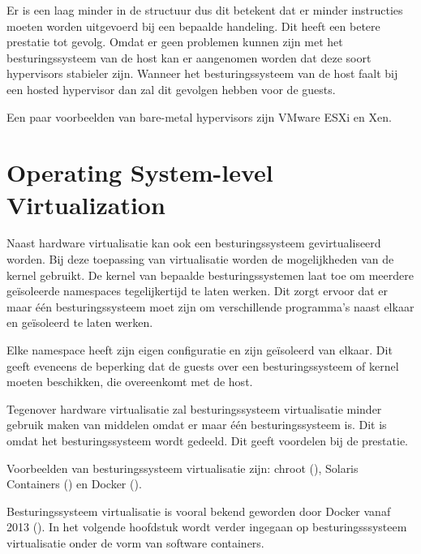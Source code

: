 Er is een laag minder in de structuur dus dit betekent dat er minder instructies moeten worden uitgevoerd bij een bepaalde handeling. Dit heeft een betere prestatie tot gevolg. Omdat er geen problemen kunnen zijn met het besturingssysteem van de host kan er aangenomen worden dat deze soort hypervisors stabieler zijn. Wanneer het besturingssysteem van de host faalt bij een hosted hypervisor dan zal dit gevolgen hebben voor de guests.

Een paar voorbeelden van bare-metal hypervisors zijn VMware ESXi en Xen.

\section{Operating System-level Virtualization}

Naast hardware virtualisatie kan ook een besturingssysteem gevirtualiseerd worden. Bij deze toepassing van virtualisatie worden de mogelijkheden van de kernel gebruikt. De kernel van bepaalde besturingssystemen laat toe om meerdere geïsoleerde namespaces tegelijkertijd te laten werken. Dit zorgt ervoor dat er maar één besturingssysteem moet zijn om verschillende programma's naast elkaar en geïsoleerd te laten werken.

Elke namespace heeft zijn eigen configuratie en zijn geïsoleerd van elkaar. Dit geeft eveneens de beperking dat de guests over een besturingssysteem of kernel moeten beschikken, die overeenkomt met de host.

Tegenover hardware virtualisatie zal besturingssysteem virtualisatie minder gebruik maken van middelen omdat er maar één besturingssysteem is. Dit is omdat het besturingssysteem wordt gedeeld. Dit geeft voordelen bij de prestatie.

Voorbeelden van besturingssysteem virtualisatie zijn: chroot (\cite{linux_chroot2_????}), Solaris Containers (\cite{oracle_solaris_2016}) en Docker (\cite{docker_docker_2016}).

Besturingssysteem virtualisatie is vooral bekend geworden door Docker vanaf 2013 (\cite{hykes_future_2013}). In het volgende hoofdstuk wordt verder ingegaan op besturingsssysteem virtualisatie onder de vorm van software containers.
